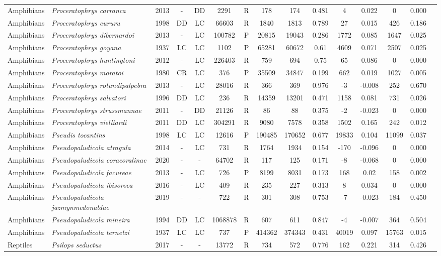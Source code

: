 \documentclass[12pt,openright,oneside,a4paper,english]{abntex2}
\begin{document}
\begin{landscape}
\begin{longtable}{llccccccccccccc}
		Amphibians&\textit{Proceratophrys carranca}&2013&-&DD&2291&R&178&174&0.481&4&0.022&0&0.000\\
		Amphibians&\textit{Proceratophrys cururu}&1998&DD&LC&66603&R&1840&1813&0.789&27&0.015&426&0.186\\
		Amphibians&\textit{Proceratophrys dibernardoi}&2013&-&LC&100782&P&20815&19043&0.286&1772&0.085&1647&0.025\\
		Amphibians&\textit{Proceratophrys goyana}&1937&LC&LC&1102&P&65281&60672&0.61&4609&0.071&2507&0.025\\
		Amphibians&\textit{Proceratophrys huntingtoni}&2012&-&LC&226403&R&759&694&0.75&65&0.086&0&0.000\\
		Amphibians&\textit{Proceratophrys moratoi}&1980&CR&LC&376&P&35509&34847&0.199&662&0.019&1027&0.005\\
		Amphibians&\textit{Proceratophrys rotundipalpebra}&2013&-&LC&28016&R&366&369&0.976&-3&-0.008&252&0.670\\
		Amphibians&\textit{Proceratophrys salvatori}&1996&DD&LC&236&R&14359&13201&0.471&1158&0.081&731&0.026\\
		Amphibians&\textit{Proceratophrys strussmannae}&2011&-&DD&21126&R&86&88&0.375&-2&-0.023&0&0.000\\
		Amphibians&\textit{Proceratophrys vielliardi}&2011&DD&LC&304291&R&9080&7578&0.358&1502&0.165&242&0.012\\
		Amphibians&\textit{Pseudis tocantins}&1998&LC&LC&12616&P&190485&170652&0.677&19833&0.104&11099&0.037\\
		Amphibians&\textit{Pseudopaludicola atragula}&2014&-&LC&731&R&1764&1934&0.154&-170&-0.096&0&0.000\\
		Amphibians&\textit{Pseudopaludicola coracoralinae}&2020&-&-&64702&R&117&125&0.171&-8&-0.068&0&0.000\\
		Amphibians&\textit{Pseudopaludicola facureae}&2013&-&LC&726&P&8199&8031&0.173&168&0.02&158&0.002\\
		Amphibians&\textit{Pseudopaludicola ibisoroca}&2016&-&LC&409&R&235&227&0.313&8&0.034&0&0.000\\
		Amphibians&\textit{Pseudopaludicola jazmynmcdonaldae}&2019&-&-&722&R&301&308&0.753&-7&-0.023&184&0.450\\
		Amphibians&\textit{Pseudopaludicola mineira}&1994&DD&LC&1068878&R&607&611&0.847&-4&-0.007&364&0.504\\
		Amphibians&\textit{Pseudopaludicola ternetzi}&1937&LC&LC&737&P&414362&374343&0.431&40019&0.097&15763&0.015\\
		Reptiles&\textit{Psilops seductus}&2017&-&-&13772&R&734&572&0.776&162&0.221&314&0.426\\

\end{longtable}
\end{landscape}
\end{document}
